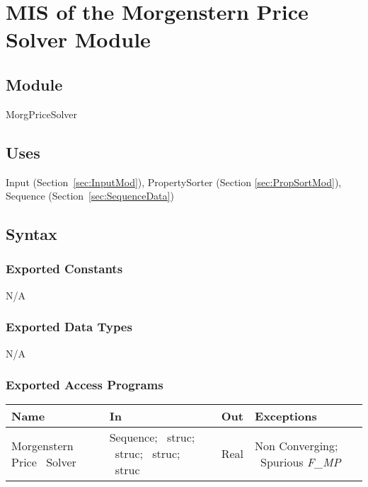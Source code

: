 \documentclass[12pt, titlepage]{article}
\begin{document}

\section{MIS of the Morgenstern Price Solver Module} \label{sec:MPMod}

\subsection{Module}
MorgPriceSolver

\subsection{Uses}

Input (Section~\ref{sec:InputMod}), PropertySorter (Section 
\ref{sec:PropSortMod}), Sequence (Section~\ref{sec:SequenceData})

\subsection{Syntax}

\subsubsection{Exported Constants}
N/A

\subsubsection{Exported Data Types}
N/A

\subsubsection{Exported Access Programs}

\begin{center}
	\renewcommand*{\arraystretch}{1.5}
	\begin{tabular} {p{}  p{}  p{} 
			p{} } \hline 
		\textbf{Name} & \textbf{In} & \textbf{Out} & \textbf{Exceptions} \\ 
		\hline

  Morgenstern Price ~\newline Solver & Sequence; ~\newline struc;
  ~\newline struc; ~\newline struc; ~\newline struc & Real & Non
  Converging; ~\newline Spurious \textit{F\_MP} \\ \hline
\end{tabular}
\end{center}
\end{document}

